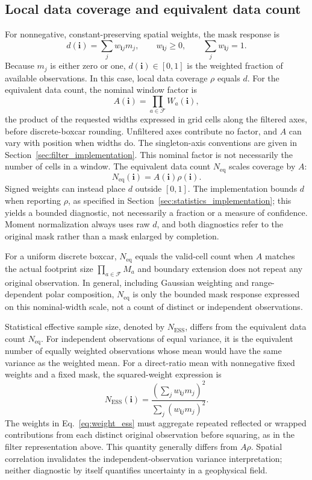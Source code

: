 \documentclass[a4paper,fleqn]{cas-sc}
\begin{document}
\subsection{Local data coverage and equivalent data count}

For nonnegative, constant-preserving spatial weights, the mask response is
\[
 d(\mathbf{i})=\sum_j w_{\mathbf{i}j}m_j,
 \qquad w_{\mathbf{i}j}\geq 0,
 \qquad \sum_j w_{\mathbf{i}j}=1.
\]
Because $m_j$ is either zero or one, $d(\mathbf{i})\in[0,1]$ is the weighted fraction of available observations. In this case, local data coverage $\rho$ equals $d$. For the equivalent data count, the nominal window factor is
\[
 A(\mathbf{i})=\prod_{a\in\mathcal{F}}W_a(\mathbf{i}),
\]
the product of the requested widths expressed in grid cells along the filtered axes, before discrete-boxcar rounding. Unfiltered axes contribute no factor, and $A$ can vary with position when widths do. The singleton-axis conventions are given in Section~\ref{sec:filter_implementation}. This nominal factor is not necessarily the number of cells in a window. The equivalent data count $N_{\mathrm{eq}}$ scales coverage by $A$:
\begin{equation}
	N_{\mathrm{eq}}(\mathbf{i})=A(\mathbf{i})\rho(\mathbf{i}).
	\label{eq:neff}
\end{equation}
Signed weights can instead place $d$ outside $[0,1]$. The implementation bounds $d$ when reporting $\rho$, as specified in Section~\ref{sec:statistics_implementation}; this yields a bounded diagnostic, not necessarily a fraction or a measure of confidence. Moment normalization always uses raw $d$, and both diagnostics refer to the original mask rather than a mask enlarged by completion.

For a uniform discrete boxcar, $N_{\mathrm{eq}}$ equals the valid-cell count when $A$ matches the actual footprint size $\prod_{a\in\mathcal{F}}M_a$ and boundary extension does not repeat any original observation. In general, including Gaussian weighting and range-dependent polar composition, $N_{\mathrm{eq}}$ is only the bounded mask response expressed on this nominal-width scale, not a count of distinct or independent observations.

Statistical effective sample size, denoted by $N_{\mathrm{ESS}}$, differs from the equivalent data count $N_{\mathrm{eq}}$. For independent observations of equal variance, it is the equivalent number of equally weighted observations whose mean would have the same variance as the weighted mean. For a direct-ratio mean with nonnegative fixed weights and a fixed mask, the squared-weight expression \citep{Kish1992} is
\begin{equation}
	N_{\mathrm{ESS}}(\mathbf{i})=\frac{\left(\sum_j w_{\mathbf{i}j}m_j\right)^2}{\sum_j\left(w_{\mathbf{i}j}m_j\right)^2}.
	\label{eq:weight_ess}
\end{equation}
The weights in Eq.~\ref{eq:weight_ess} must aggregate repeated reflected or wrapped contributions from each distinct original observation before squaring, as in the filter representation above. This quantity generally differs from $A\rho$. Spatial correlation invalidates the independent-observation variance interpretation; neither diagnostic by itself quantifies uncertainty in a geophysical field.
\end{document}
